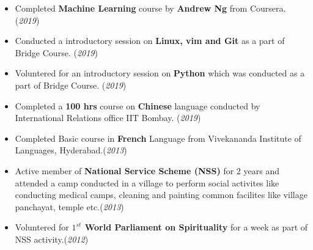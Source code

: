 \documentclass[10pt]{article}
\begin{document}
\colorbox{bl}{}
\vspace{-0.45cm}
\begin{itemize}[leftmargin=0.4cm]
		\item {Completed \textbf{Machine Learning} course by \textbf{Andrew Ng} from Coursera. }\hfill{(\textit{2019})}\vspace{-0.2cm}
	\item {Conducted a introductory session on \textbf{Linux, vim and Git} as a part of Bridge Course. }\hfill{(\textit{2019})}\vspace{-0.2cm}
	\item {Voluntered for an introductory session on \textbf{Python} which was conducted as a part of Bridge Course.}
	\hfill{(\textit{2019})}\vspace{-0.2cm}

    \item {Completed a \textbf{100 hrs} course on \textbf{Chinese} language conducted by International Relations office IIT Bombay. }\hfill{(\textit{2019})}\vspace{-0.2cm}
    \item {Completed Basic course in \textbf{French} Language from Vivekananda Institute of Languages, Hyderabad.}\hfill{(\textit{2013})}\vspace{-0.2cm}

   \item {Active member of \textbf{National Service Scheme (NSS)} for 2 years and attended a camp conducted in a village to perform social activites like conducting medical camps, cleaning and painting common facilites like village panchayat, temple etc.}\hfill{(\textit{2013})}\vspace{-0.2cm}
   \item {Voluntered for \textbf{$1^{st}$ World Parliament on Spirituality} for a week as part of NSS activity.}\hfill{(\textit{2012})}\vspace{-0.2cm}
    
\end{itemize}

\end{document}
